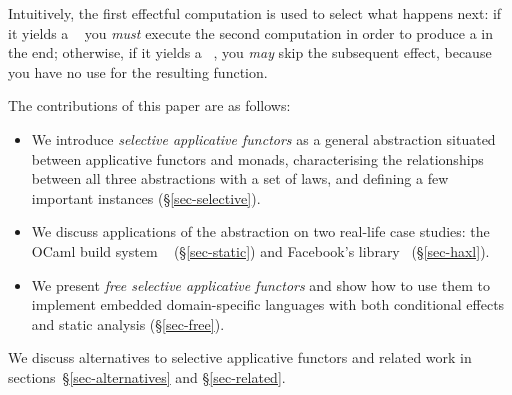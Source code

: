 \noindent
Intuitively, the first effectful computation is used to select what happens
next: if it yields a ~ you \emph{must} execute the second
computation in order to produce a  in the end; otherwise, if it yields a
~, you \emph{may} skip the subsequent effect, because you have
no use for the resulting function.

The contributions of this paper are as follows:

\vspace{-1mm}
\begin{itemize}
    \item We introduce \emph{selective applicative functors} as a general
    abstraction situated between applicative functors and monads, characterising
    the relationships between all three abstractions with a set of laws, and
    defining a few important instances (\S\ref{sec-selective}).
    \item We discuss applications of the abstraction on two real-life case
    studies: the OCaml build system \Dune~\citep{dune} (\S\ref{sec-static}) and
    Facebook's \Haxl library~\cite{marlow2014haxl} (\S\ref{sec-haxl}).
    \item We present \emph{free selective applicative functors} and show how to
    use them to implement embedded domain-specific languages with both
    conditional effects and static analysis (\S\ref{sec-free}).
\end{itemize}

We discuss alternatives to selective applicative functors and related work in
sections~\S\ref{sec-alternatives} and \S\ref{sec-related}.
